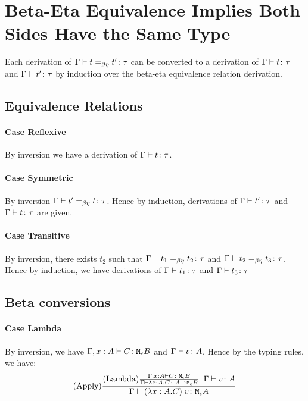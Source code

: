 {    \section{Beta-Eta Equivalence Implies Both Sides Have the Same Type}
    Each derivation of $\Gamma \vdash t =_{\beta\eta} t' \colon \tau$ can be converted to a derivation of $\Gamma \vdash t \colon \tau$ and $\Gamma \vdash t' \colon \tau$ by induction over the beta-eta equivalence relation derivation.

    \subsection{Equivalence Relations}
    \paragraph{Case Reflexive}
    By inversion we have a derivation of $\Gamma \vdash t \colon \tau$.

    \paragraph{Case Symmetric}
    By inversion $\Gamma \vdash t' =_{\beta\eta} t \colon \tau$. Hence by induction, derivations of $\Gamma \vdash t' \colon \tau$ and $\Gamma \vdash t \colon \tau$ are given.

    \paragraph{Case Transitive}
    By inversion, there exists $t_2$ such that $\Gamma \vdash t_1 =_{\beta\eta} t_2 \colon \tau$ and $\Gamma \vdash t_2 =_{\beta\eta} t_3 \colon \tau$. Hence by induction, we have derivations of $\Gamma \vdash t_1 \colon \tau$ and $\Gamma \vdash t_3 \colon \tau$

    \subsection{Beta conversions}
    
    \paragraph{Case Lambda}
        By inversion, we have $\Gamma, x: A \vdash C \colon \texttt{M}_{\epsilon}{B}$ and $\Gamma \vdash v \colon A$. Hence by the typing rules, we have:
        $$(\text{Apply}) \frac{
            (\text{Lambda}) \frac{\Gamma, x: A  \vdash C \colon \texttt{M}_{\epsilon}{B}}{\Gamma \vdash \lambda x : A. C \colon A \rightarrow \texttt{M}_{\epsilon}{B}}
            \;\;
            \Gamma \vdash v \colon A
        }{\Gamma \vdash (\lambda x : A. C)\; v \colon \texttt{M}_{\epsilon}{A}}$$

}

